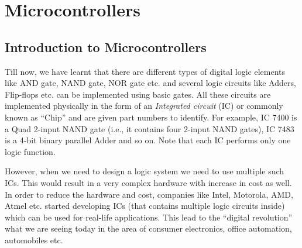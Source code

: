 \makeatletter
\def\@makechapterhead#1{%
  \vspace*{10\p@}%
  {\parindent \z@ \raggedleft \normalfont
    \ifnum \c@secnumdepth >\m@ne
      \if@mainmatter
        \LARGE\bfseries \@chapapp\space \thechapter
	\vskip 4pt
        \hrule height 2pt
        \par\nobreak
        \vskip 5\p@
      \fi
    \fi
    \interlinepenalty\@M
    \huge \bfseries #1\par\nobreak
\vskip 5pt

\hrule height 2pt   
 \vskip 10\p@  
  }}
\makeatother

\chapter{Microcontrollers}\label{chap7}

\section{Introduction to Microcontrollers}\label{sec7.1}

Till now, we have learnt that there are different types of digital logic elements like AND gate, NAND gate, NOR gate etc. and several logic circuits like Adders, Flip-flops etc. can be implemented using basic gates. All these circuits are implemented physically in the form of an {\em Integrated circuit} (IC) or commonly known as ``Chip'' and are given part numbers to identify. For example, IC 7400 is a Quad 2-input NAND gate (i.e., it contains four 2-input NAND gates), IC 7483 is a 4-bit binary parallel Adder and so on. Note that each IC performs only one logic function.

However, when we need to design a logic system we need to use multiple such ICs. This would result in a very complex hardware with increase in cost as well. In order to reduce the hardware and cost, companies like Intel, Motorola, AMD, Atmel etc. started developing ICs (that contains multiple logic circuits inside) which can be used for real-life applications. This lead to the ``digital revolution'' what we are seeing today in the area of consumer electronics, office automation, automobiles etc.

